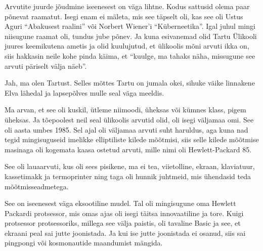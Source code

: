 

Arvutite juurde jõudmine iseenesest on väga lihtne. Kodus sattusid olema paar 
põnevat raamatut. Isegi enam ei mäleta, mis see täpselt oli, kas see oli Ustus 
Aguri \enquote{Abakusest raalini} või Norbert Wiener'i \enquote{Küberneetika}. Igal juhul mingi niisugune raamat oli, tundus jube põnev. Ja 
 kuna esivanemad olid Tartu Ülikooli juures keemikutena 
ametis ja olid kuulujutud, et ülikoolis mõni arvuti ikka on, siis hakkasin 
neile kohe pinda käima, et \enquote{kuulge, ma tahaks näha, missugune see 
arvuti päriselt välja näeb}.


Jah, ma olen Tartust. Selles mõttes Tartu on jumala okei, sihuke  väike 
linnakene Elva lähedal ja lapsepõlves mulle seal väga meeldis. 


Ma arvan, et see oli kuskil, ütleme niimoodi, üheksas või kümnes klass, pigem 
üheksas. Ja tõepoolest neil seal ülikoolis arvutid olid, oli isegi väljamaa 
omi. See oli aasta umbes 1985. Sel ajal oli  väljamaa arvuti  suht  haruldus, 
aga kuna nad tegid mingisuguseid imelikke elliptiliste kilede mõõtmisi, siis 
selle kilede mõõtmise masinaga oli kogemata kaasa ostetud  arvuti, mille nimi 
oli Hewlett-Packard 85. 


See oli lauaarvuti, kus oli sees pisikene, ma ei tea, viietolline, ekraan, 
klaviatuur, kassetimakk ja termoprinter ning taga oli hunnik juhtmeid, mis 
ühendasid teda mõõtmisseadmetega.


See on iseenesest väga eksootiline mudel. Tal oli mingisugune oma Hewlett 
Packardi protsessor, mis  omas ajas oli isegi täitsa innovaatiline ja 
tore. Kuigi protsessor protsessoriks, millega see välja paistis, oli tavaline 
Basic ja see, et ekraani peal sai jutte joonistada. Ja kui 
ise jutte joonistada ei osanud, siis sai pingpongi või kosmonautide maandumist 
mängida. 

